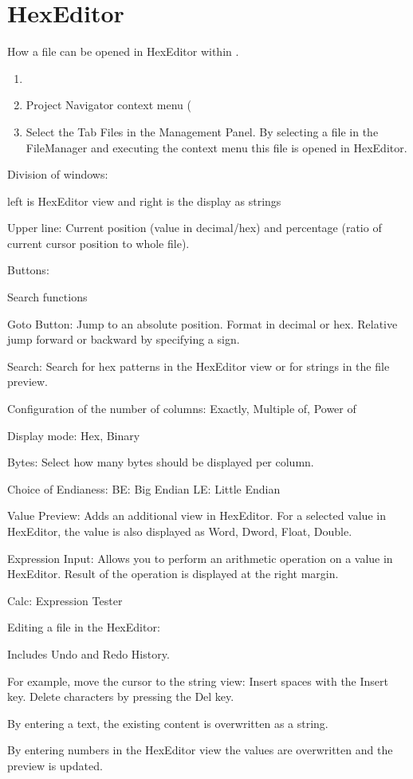 \section{HexEditor}\label{sec:hexeditor}

How a file can be opened in HexEditor within \codeblocks.

\begin{enumerate}
\item {}
\item Project Navigator context menu (
\item Select the Tab Files in the Management Panel. By selecting a file in the FileManager and executing the context menu  this file is opened in HexEditor.
\end{enumerate}

Division of windows:

left is HexEditor view and right is the display as strings

Upper line:
Current position (value in decimal/hex) and percentage (ratio of current cursor position to whole file).

Buttons:

Search functions

Goto Button: Jump to an absolute position. Format in decimal or hex. Relative jump forward or backward by specifying a sign.

Search: Search for hex patterns in the HexEditor view or for strings in the file preview.

Configuration of the number of columns:
Exactly, Multiple of, Power of

Display mode:
Hex, Binary

Bytes:
Select how many bytes should be displayed per column.

Choice of Endianess:
BE: Big Endian
LE: Little Endian

Value Preview:
Adds an additional view in HexEditor. For a selected value in HexEditor, the value is also displayed as Word, Dword, Float, Double.

Expression Input:
Allows you to perform an arithmetic operation on a value in HexEditor. Result of the operation is displayed at the right margin.

Calc:
Expression Tester

Editing a file in the HexEditor:

Includes Undo and Redo History.

For example, move the cursor to the string view:
Insert spaces with the Insert key.
Delete characters by pressing the Del key.

By entering a text, the existing content is overwritten as a string.

By entering numbers in the HexEditor view the values are overwritten and the preview is updated.

